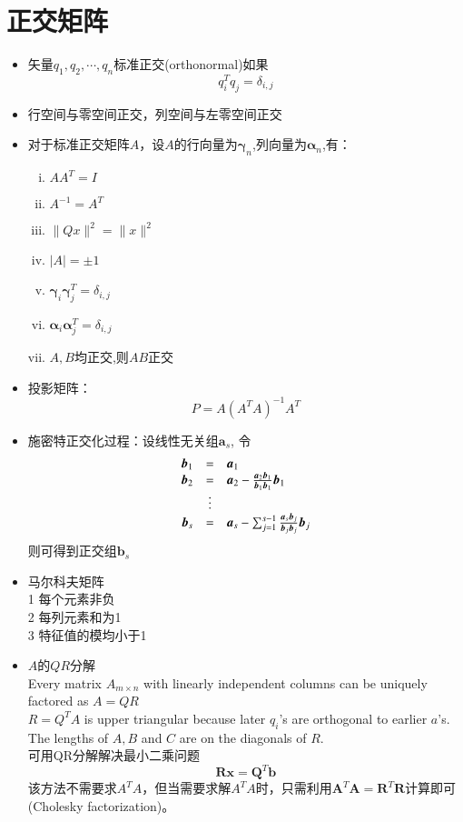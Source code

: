 \documentclass[UTF8,9pt]{ctexart}
\begin{document}
\section{正交矩阵}
\begin{itemize}
	\item 矢量$q_1,q_2, \cdots,q_n$标准正交(orthonormal)如果
	$$q^T_iq_j=\delta_{i,j}$$
	\item 行空间与零空间正交，列空间与左零空间正交
	\item 对于标准正交矩阵$A$，设$A$的行向量为$\bm{\gamma}_n$,列向量为$\bm{\alpha}_n$,有：\\
		\begin{enumerate}[(i)]
			\item $AA^T=I$
			\item $A^{-1}=A^T$
			\item $\| Qx \| ^2 = \|x\| ^2$
			\item $|A|= \pm1$
			\item $\bm{\gamma}_i\bm{\gamma}_j^T = \delta_{i,j}$
			\item $\bm{\alpha}_i\bm{\alpha}_j^T = \delta_{i,j}$
			\item $A,B$均正交,则$AB$正交
		\end{enumerate}
	\item 投影矩阵：
		$$P=A(A^TA)^{-1}A^T$$
	\item 施密特正交化过程：设线性无关组$\bm{a}_s$, 令
		$$\ar[rcl]{
			\bm{b}_1 &= & \bm{a}_1                                                                   \\
			\bm{b}_2  &= & \bm{a}_2-\frac{\bm{a}_2\bm{b}_1}{\bm{b}_1\bm{b}_1}\bm{b}_1                 \\
					& \vdots &                                                                    \\
			\bm{b}_s & = & \bm{a}_s-\sum_{j=1}^{s-1}\frac{\bm{a}_s\bm{b}_j}{\bm{b}_j\bm{b}_j}\bm{b}_j
		}$$
		则可得到正交组$\bm{b}_s$
	\item 马尔科夫矩阵\\
		1 每个元素非负\\
		2 每列元素和为1\\
		3 特征值的模均小于1
	\item $A$的$QR$分解\\
	Every matrix $A_{m×n}$ with linearly independent columns can be uniquely factored as $A = QR$\\
	$R = Q^TA$ is upper triangular because later $q_i$'s are orthogonal to earlier $a$'s. The lengths of $A, B$ and $C$ are on the diagonals of $R$.\\
	可用QR分解解决最小二乘问题
	$$\mathbf { R } \mathbf { x } = \mathbf { Q } ^ { T } \mathbf { b }$$
	该方法不需要求$A^TA$，但当需要求解$A^TA$时，只需利用$\mathbf { A } ^ { T } \mathbf { A } = \mathbf { R } ^ { T } \mathbf { R }$计算即可(Cholesky factorization)。
\end{itemize}
\end{document}
